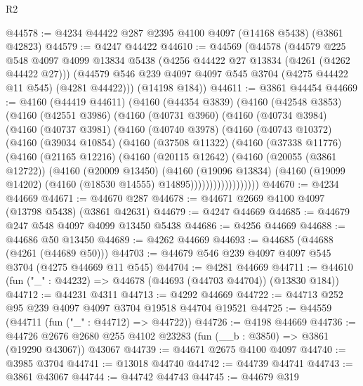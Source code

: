\begin{lexlean}{R2}
\begin{coremodule}
@44578 := @4234 @44422 @287 @2395 @4100 @4097 (@14168 @5438) (@3861 @42823)
@44579 := @4247 @44422
@44610 := @44569
    (@44578
      (@44579
        @225
        @548
        @4097
        @4099
        @13834
        @5438
        (@4256 @44422 @27 @13834 (@4261 (@4262 @44422 @27)))
        (@44579 @546 @239 @4097 @4097 @545 @3704 (@4275 @44422 @11 @545) (@4281 @44422)))
      (@14198 @184))
@44611 := @3861 @44454
@44669 := @4160
    (@44419 @44611)
    (@4160
      (@44354 @3839)
      (@4160
        (@42548 @3853)
        (@4160
          (@42551 @3986)
          (@4160
            (@40731 @3960)
            (@4160
              (@40734 @3984)
              (@4160
                (@40737 @3981)
                (@4160
                  (@40740 @3978)
                  (@4160
                    (@40743 @10372)
                    (@4160
                      (@39034 @10854)
                      (@4160
                        (@37508 @11322)
                        (@4160
                          (@37338 @11776)
                          (@4160
                            (@21165 @12216)
                            (@4160
                              (@20115 @12642)
                              (@4160
                                (@20055 (@3861 @12722))
                                (@4160
                                  (@20009 @13450)
                                  (@4160
                                    (@19096 @13834)
                                    (@4160
                                      (@19099 @14202)
                                      (@4160 (@18530 @14555) @14895))))))))))))))))))
@44670 := @4234 @44669
@44671 := @44670 @287
@44678 := @44671 @2669 @4100 @4097 (@13798 @5438) (@3861 @42631)
@44679 := @4247 @44669
@44685 := @44679 @247 @548 @4097 @4099 @13450 @5438
@44686 := @4256 @44669
@44688 := @44686 @50 @13450
@44689 := @4262 @44669
@44693 := @44685 (@44688 (@4261 (@44689 @50)))
@44703 := @44679 @546 @239 @4097 @4097 @545 @3704 (@4275 @44669 @11 @545)
@44704 := @4281 @44669
@44711 := @44610 (fun ("_" : @44232) => @44678 (@44693 (@44703 @44704)) (@13830 @184))
@44712 := @44231 @4311
@44713 := @4292 @44669
@44722 := @44713 @252 @95 @239 @4097 @4097 @3704 @19518 @44704 @19521
@44725 := @44559 (@44711 (fun ("_" : @44712) => @44722))
@44726 := @4198 @44669
@44736 := @44726 @2676 @2680 @255 @4102 @23283 (fun (__b : @3850) => @3861 (@19290 @43067)) @43067
@44739 := @44671 @2675 @4100 @4097
@44740 := @3985 @3704
@44741 := @13018 @44740
@44742 := @44739 @44741
@44743 := @3861 @43067
@44744 := @44742 @44743
@44745 := @44679 @319

\end{coremodule}
\end{lexlean}
